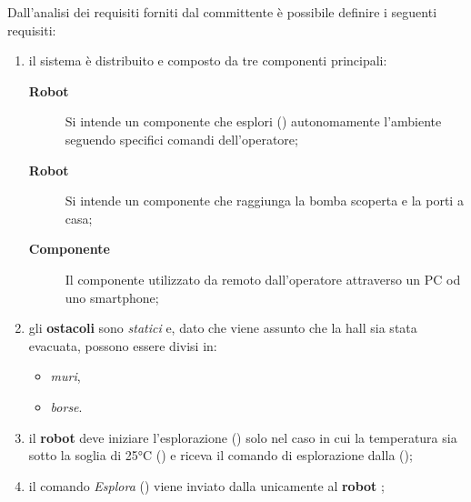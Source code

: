 

Dall'analisi dei requisiti forniti dal committente è possibile definire i seguenti requisiti:

\begin{enumerate}
  \item
    il sistema è distribuito e composto da tre componenti principali:
    \begin{description}
      \item[\textbf{Robot }] Si intende un componente che esplori () autonomamente l'ambiente seguendo specifici comandi dell'operatore;
      \item[\textbf{Robot }] Si intende un componente che raggiunga la bomba scoperta e la porti a casa;
      \item[\textbf{Componente }] Il componente utilizzato da remoto dall'operatore attraverso un PC od uno smartphone;
    \end{description}

  \item
    gli \textbf{ostacoli} sono \textit{statici} e, dato che viene assunto che la hall sia stata evacuata, possono essere divisi in:
    \begin{itemize}
      \item \textit{muri},
      \item \textit{borse}.
    \end{itemize}

  \item
    il \textbf{robot } deve iniziare l'esplorazione () solo nel caso in cui la temperatura sia sotto la soglia di 25°C () e riceva il comando di esplorazione dalla \textbf{} ();

  \item
    il comando \textit{Esplora} () viene inviato dalla \textbf{} unicamente al \textbf{robot };


\end{enumerate}
